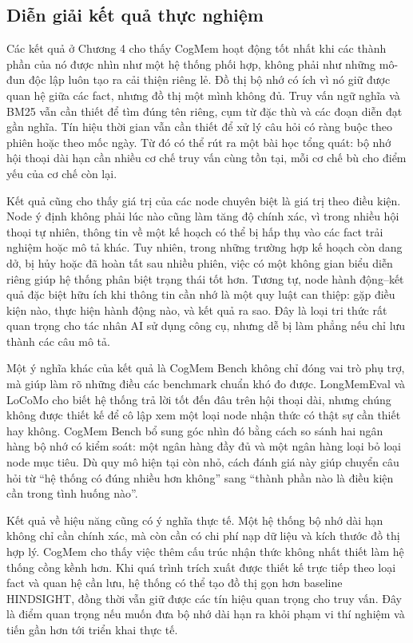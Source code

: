 \documentclass[../main.tex]{subfiles}
\begin{document}
\subsection{Diễn giải kết quả thực nghiệm}

Các kết quả ở Chương 4 cho thấy CogMem hoạt động tốt nhất khi các thành phần của nó được nhìn như một hệ thống phối hợp, không phải như những mô-đun độc lập luôn tạo ra cải thiện riêng lẻ. Đồ thị bộ nhớ có ích vì nó giữ được quan hệ giữa các fact, nhưng đồ thị một mình không đủ. Truy vấn ngữ nghĩa và BM25 vẫn cần thiết để tìm đúng tên riêng, cụm từ đặc thù và các đoạn diễn đạt gần nghĩa. Tín hiệu thời gian vẫn cần thiết để xử lý câu hỏi có ràng buộc theo phiên hoặc theo mốc ngày. Từ đó có thể rút ra một bài học tổng quát: bộ nhớ hội thoại dài hạn cần nhiều cơ chế truy vấn cùng tồn tại, mỗi cơ chế bù cho điểm yếu của cơ chế còn lại.

Kết quả cũng cho thấy giá trị của các node chuyên biệt là giá trị theo điều kiện. Node ý định không phải lúc nào cũng làm tăng độ chính xác, vì trong nhiều hội thoại tự nhiên, thông tin về một kế hoạch có thể bị hấp thụ vào các fact trải nghiệm hoặc mô tả khác. Tuy nhiên, trong những trường hợp kế hoạch còn dang dở, bị hủy hoặc đã hoàn tất sau nhiều phiên, việc có một không gian biểu diễn riêng giúp hệ thống phân biệt trạng thái tốt hơn. Tương tự, node hành động--kết quả đặc biệt hữu ích khi thông tin cần nhớ là một quy luật can thiệp: gặp điều kiện nào, thực hiện hành động nào, và kết quả ra sao. Đây là loại tri thức rất quan trọng cho tác nhân AI sử dụng công cụ, nhưng dễ bị làm phẳng nếu chỉ lưu thành các câu mô tả.

Một ý nghĩa khác của kết quả là CogMem Bench không chỉ đóng vai trò phụ trợ, mà giúp làm rõ những điều các benchmark chuẩn khó đo được. LongMemEval và LoCoMo cho biết hệ thống trả lời tốt đến đâu trên hội thoại dài, nhưng chúng không được thiết kế để cô lập xem một loại node nhận thức có thật sự cần thiết hay không. CogMem Bench bổ sung góc nhìn đó bằng cách so sánh hai ngân hàng bộ nhớ có kiểm soát: một ngân hàng đầy đủ và một ngân hàng loại bỏ loại node mục tiêu. Dù quy mô hiện tại còn nhỏ, cách đánh giá này giúp chuyển câu hỏi từ ``hệ thống có đúng nhiều hơn không'' sang ``thành phần nào là điều kiện cần trong tình huống nào''.

Kết quả về hiệu năng cũng có ý nghĩa thực tế. Một hệ thống bộ nhớ dài hạn không chỉ cần chính xác, mà còn cần có chi phí nạp dữ liệu và kích thước đồ thị hợp lý. CogMem cho thấy việc thêm cấu trúc nhận thức không nhất thiết làm hệ thống cồng kềnh hơn. Khi quá trình trích xuất được thiết kế trực tiếp theo loại fact và quan hệ cần lưu, hệ thống có thể tạo đồ thị gọn hơn baseline HINDSIGHT, đồng thời vẫn giữ được các tín hiệu quan trọng cho truy vấn. Đây là điểm quan trọng nếu muốn đưa bộ nhớ dài hạn ra khỏi phạm vi thí nghiệm và tiến gần hơn tới triển khai thực tế.
\end{document}
